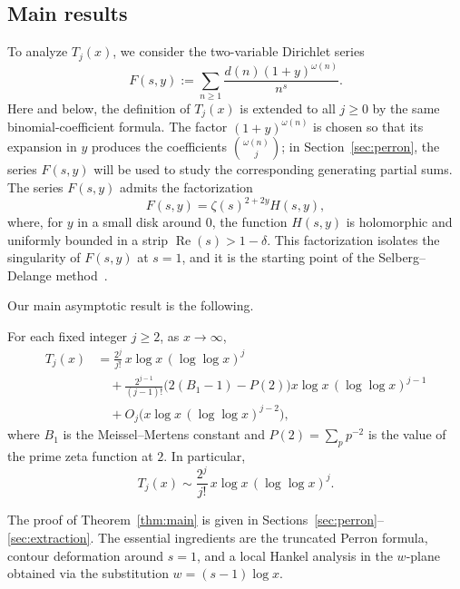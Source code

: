 \subsection{Main results}

To analyze \(T_j(x)\), we consider the two-variable Dirichlet series
\[
F(s,y):=\sum_{n\ge1}\frac{d(n)(1+y)^{\omega(n)}}{n^s}.
\]
Here and below, the definition of \(T_j(x)\) is extended to all \(j\ge0\)
by the same binomial-coefficient formula. The factor \((1+y)^{\omega(n)}\)
is chosen so that its expansion in \(y\) produces the coefficients
\(\binom{\omega(n)}j\); in Section~\ref{sec:perron}, the series \(F(s,y)\) will be used
to study the corresponding generating partial sums.
The series $F(s, y)$ admits the factorization
\begin{equation}
    F(s, y) = \zeta(s)^{2+2y} H(s, y),
\end{equation}
where, for \(y\) in a small disk around \(0\), the function \(H(s,y)\) is holomorphic and uniformly bounded in a strip \(\operatorname{Re}(s)>1-\delta\). This factorization isolates the singularity of
$F(s, y)$ at $s = 1$, and it is the starting point of the
Selberg--Delange method~\cite[Chapter II.5]{Tenenbaum1995}.

Our main asymptotic result is the following.

\begin{theorem}\label{thm:main}
For each fixed integer $j \geq 2$, as $x \to \infty$,
\begin{equation}
\begin{aligned}
    T_j(x)
    &= \frac{2^j}{j!} \, x \log x \, (\log \log x)^j \\
    &\quad + \frac{2^{j-1}}{(j-1)!}
       \bigl(2(B_1 - 1)-P(2)\bigr)
       x \log x \, (\log \log x)^{j-1} \\
    &\quad + O_{j}\bigl(x \log x \, (\log \log x)^{j-2}\bigr),
\end{aligned}
\end{equation}
where \(B_1\) is the Meissel--Mertens constant and
\(P(2)=\sum_p p^{-2}\) is the value of the prime zeta function at \(2\). In particular,
\begin{equation}
    T_j(x) \sim \frac{2^j}{j!} \, x \log x \, (\log \log x)^j.
\end{equation}
\end{theorem}

The proof of Theorem~\ref{thm:main} is given in Sections~\ref{sec:perron}--\ref{sec:extraction}. The essential ingredients
are the truncated Perron formula, contour deformation around
$s = 1$, and a local Hankel analysis in the $w$-plane obtained
via the substitution $w = (s - 1) \log x$.

